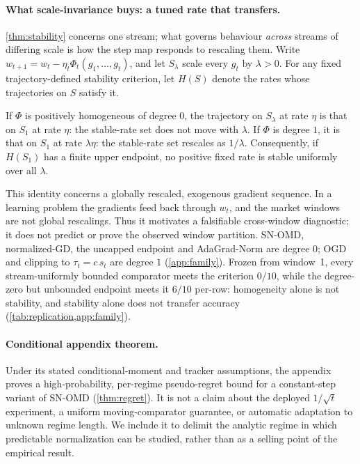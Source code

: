 \documentclass{article}
\begin{document}
\paragraph{What scale-invariance buys: a tuned rate that transfers.} \cref{thm:stability}
concerns one stream; what governs behaviour \emph{across} streams of differing scale is how the
step map responds to rescaling them. Write $w_{t+1}=w_t-\eta_t\Phi_t(g_1,\dots,g_t)$, and let
$S_\lambda$ scale every $g_t$ by $\lambda>0$. For any fixed trajectory-defined stability
criterion, let $H(S)$ denote the rates whose trajectories on $S$ satisfy it.
\begin{theorem}
\label{thm:transfer}
If $\Phi$ is positively homogeneous of degree $0$, the trajectory on $S_\lambda$ at rate $\eta$
is that on $S_1$ at rate $\eta$: the stable-rate set does not move with $\lambda$. If $\Phi$ is
degree $1$, it is that on $S_1$ at rate $\lambda\eta$: the stable-rate set rescales as
$1/\lambda$. Consequently, if $H(S_1)$ has a finite upper endpoint, no positive fixed rate is
stable uniformly over all $\lambda$.
\end{theorem}
This identity concerns a globally rescaled, exogenous gradient sequence. In a learning problem
the gradients feed back through $w_t$, and the market windows are not global rescalings. Thus it
motivates a falsifiable cross-window diagnostic; it does not predict or prove the observed
window partition.
SN-OMD, normalized-GD, the uncapped endpoint and AdaGrad-Norm are degree $0$; OGD and clipping
to $\tau_t=c\,s_t$ are degree $1$ (\cref{app:family}). Frozen from window~1, every
stream-uniformly bounded comparator meets the criterion $0/10$, while the degree-zero but
unbounded endpoint meets it $6/10$ per-row: homogeneity alone is not stability, and stability
alone does not transfer accuracy (\cref{tab:replication,app:family}).

\paragraph{Conditional appendix theorem.} Under its stated conditional-moment and tracker
assumptions, the appendix proves a high-probability, per-regime pseudo-regret bound for a
constant-step variant of SN-OMD (\cref{thm:regret}). It is not a claim about the deployed
$1/\sqrt t$ experiment, a uniform moving-comparator guarantee, or automatic adaptation to
unknown regime length. We include it to delimit the analytic regime in which predictable
normalization can be studied, rather than as a selling point of the empirical result.
\end{document}
